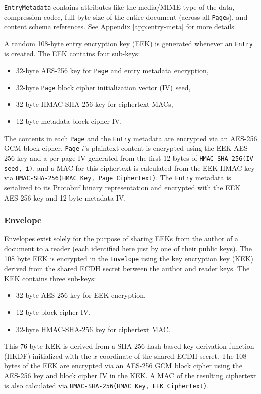 \documentclass[10pt]{article}
\newcommand{\ttt}[1]{\texttt{#1}}
\def\Entry{\ttt{Entry}}
\def\Page{\ttt{Page}}
\def\Envelope{\ttt{Envelope}}
\begin{document}
\ttt{EntryMetadata} contains attributes like the media/MIME type of the data, compression codec, full byte size of the entire document (across all \Page{}s), and content schema references. See Appendix \ref{app:entry-meta} for more details. 

A random 108-byte entry encryption key (EEK) is generated whenever an \Entry{} is created. The EEK contains four sub-keys:
\begin{itemize}
	\item 32-byte AES-256 key for \Page{} and entry metadata encryption,
	\item 32-byte \Page{} block cipher initialization vector (IV) seed,
	\item 32-byte HMAC-SHA-256 key for ciphertext MACs,
	\item 12-byte metadata block cipher IV.
\end{itemize}
The contents in each \Page{} and the \Entry{} metadata are encrypted via an AES-256 GCM block cipher. \Page{} $i$'s plaintext content is encrypted using the EEK AES-256 key and a per-page IV generated from the first 12 bytes of \ttt{HMAC-SHA-256(IV seed, i)}, and a MAC for this ciphertext is calculated from the EEK HMAC key via \ttt{HMAC-SHA-256(HMAC Key, Page Ciphertext)}. The \Entry{} metadata is serialized to its Protobuf binary representation and encrypted with the EEK AES-256 key and 12-byte metadata IV. 

\subsubsection{Envelope}
Envelopes exist solely for the purpose of sharing EEKs from the author of a document to a reader (each identified here just by one of their public keys). The 108 byte EEK is encrypted in the \Envelope{} using the key encryption key (KEK) derived from the shared ECDH secret between the author and reader keys. The KEK contains three sub-keys:
\begin{itemize}
	\item 32-byte AES-256 key for EEK encryption,
	\item 12-byte block cipher IV,
	\item 32-byte HMAC-SHA-256 key for ciphertext MAC.
\end{itemize}
This 76-byte KEK is derived from a SHA-256 hash-based key derivation function (HKDF) initialized with the $x$-coordinate of the shared ECDH secret. The 108 bytes of the EEK are encrypted via an AES-256 GCM block cipher using the AES-256 key and block cipher IV in the KEK. A MAC of the resulting ciphertext is also calculated via \ttt{HMAC-SHA-256(HMAC Key, EEK Ciphertext)}.
\end{document}
